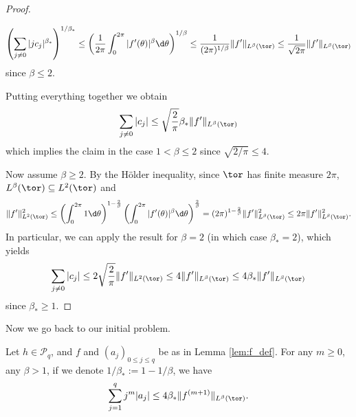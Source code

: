 \begin{proof}
\begin{itemize}
\begin{equation*}
    \left(\sum_{j \neq 0} |j c_j|^{\beta_*} \right)^{1/\beta_*}
    \leq
    \left(\frac{1}{2 \pi} \int_0^{2 \pi} |f'(\theta)|^\beta \d \theta\right)^{1/\beta}
    \leq \frac{1}{(2 \pi)^{1/\beta}} \|f'\|_{L^\beta(\tor)}
    \leq \frac{1}{\sqrt{2 \pi}} \|f'\|_{L^\beta(\tor)}
  \end{equation*}
  since $\beta \leq 2$.
  \end{itemize}
  Putting everything together we obtain
  \begin{equation*}
    \sum_{j \neq 0} |c_j|
    \leq \sqrt{\frac{2}{\pi}} \beta_*  \|f'\|_{L^\beta(\tor)}
  \end{equation*}
  which implies the claim in the case $1 < \beta \leq 2$ since $\sqrt{2/\pi} \leq 4$.

  Now assume $\beta \geq 2$.
  By the H\"older inequality, since $\tor$ has finite measure $2 \pi$,
  $L^\beta(\tor) \subseteq L^2(\tor)$ and
  \begin{equation*}
    \|f'\|_{L^2(\tor)}^2
   \leq  \left(\int_0^{2 \pi} 1 \d \theta\right)^{1-\frac{2}{\beta}}
    \left(\int_0^{2 \pi} |f'(\theta)|^{\beta} \d \theta\right)^{\frac{2}{\beta}}
    = (2 \pi)^{1-\frac{2}{\beta}}  \|f'\|_{L^\beta(\tor)}^2
    \leq 2 \pi \|f'\|_{L^\beta(\tor)}^2.
  \end{equation*}
  In particular, we can apply the result for $\beta=2$ (in which case $\beta_*=2$),
  which yields
  \begin{equation*}
    \sum_{j \neq 0} |c_j|
    \leq 2 \sqrt{\frac{2}{\pi}}  \|f'\|_{L^2(\tor)}
    \leq 4 \|f'\|_{L^\beta(\tor)}
    \leq 4 \beta_*  \|f'\|_{L^\beta(\tor)}
  \end{equation*}
  since $\beta_* \geq 1$.
\end{proof}

Now we go back to our initial problem.

\begin{lemma}
  \label{lem:bound_sum_aj}
  Let $h \in \mathcal{P}_q$, and $f$ and $(a_j)_{0 \leq j \leq q}$ be as in Lemma \ref{lem:f_def}.
  For any $m \geq 0$,
  any $\beta > 1$, if we denote $1/\beta_* := 1 - 1/\beta$, we have
  \begin{equation*}
    \sum_{j=1}^q j^m |a_j| \leq 4 \beta_* \|f^{(m+1)}\|_{L^\beta(\tor)}.
  \end{equation*}
\end{lemma}

